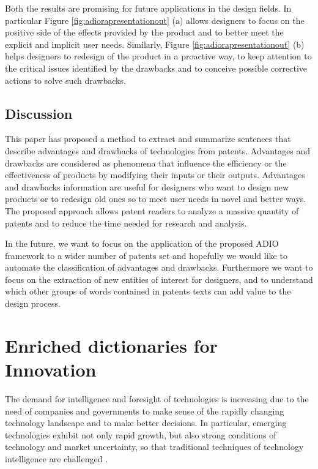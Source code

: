 \documentclass[]{book}
\theoremstyle{definition}
\theoremstyle{definition}
\theoremstyle{definition}
\theoremstyle{remark}
\begin{document}
Both the results are promising for future applications in the design
fields. In particular Figure \ref{fig:adiorapresentationout} (a) allows
designers to focus on the positive side of the effects provided by the
product and to better meet the explicit and implicit user needs.
Similarly, Figure \ref{fig:adiorapresentationout} (b) helps designers to
redesign of the product in a proactive way, to keep attention to the
critical issues identified by the drawbacks and to conceive possible
corrective actions to solve such drawbacks.

\section{Discussion}\label{discussion}

This paper has proposed a method to extract and summarize sentences that
describe advantages and drawbacks of technologies from patents.
Advantages and drawbacks are considered as phenomena that influence the
efficiency or the effectiveness of products by modifying their inputs or
their outputs. Advantages and drawbacks information are useful for
designers who want to design new products or to redesign old ones so to
meet user needs in novel and better ways. The proposed approach allows
patent readers to analyze a massive quantity of patents and to reduce
the time needed for research and analysis.

In the future, we want to focus on the application of the proposed ADIO
framework to a wider number of patents set and hopefully we would like
to automate the classification of advantages and drawbacks. Furthermore
we want to focus on the extraction of new entities of interest for
designers, and to understand which other groups of words contained in
patents texts can add value to the design process.

\chapter{Enriched dictionaries for
Innovation}\label{enriched-dictionaries-for-innovation}

The demand for intelligence and foresight of technologies is increasing
due to the need of companies and governments to make sense of the
rapidly changing technology landscape and to make better decisions. In
particular, emerging technologies exhibit not only rapid growth, but
also strong conditions of technology and market uncertainty, so that
traditional techniques of technology intelligence are challenged
\citep{rotolo2015emerging}.
\end{document}
